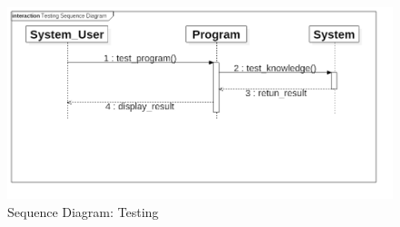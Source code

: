 \begin{figure}[H] %
\begin{center}
	\includegraphics[width = 6in]{images/TestingSequence.png}
	\caption{Sequence Diagram: Testing} %
	\label{Sequence} %
\end{center}
\end{figure}

